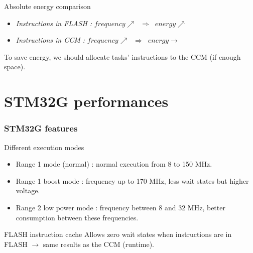 \documentclass[
	11pt, %
]{beamer}
\begin{document}
\begin{frame}{Absolute energy comparison}
\begin{figure}
	\end{figure}
	\begin{itemize}
		\item \emph{Instructions in FLASH :} $frequency \nearrow \; \; \Rightarrow \; \; energy \nearrow$
		\item \emph{Instructions in CCM : } $frequency \nearrow \; \; \Rightarrow \; \; energy \rightarrow$ 
	\end{itemize}
	To save energy, we should allocate tasks' instructions to the CCM (if enough space).
\end{frame}


\section{STM32G performances}
\begin{frame}
	\frametitle{STM32G features}
	\begin{block}{Different execution modes}
		\begin{itemize}
			\item Range 1 mode (normal) : normal execution from 8 to 150 MHz.
			\item Range 1 boost mode : frequency up to 170 MHz, less wait states but higher voltage.
			\item Range 2 low power mode : frequency between 8 and 32 MHz, better consumption between these frequencies.
		\end{itemize}
	\end{block}
	\begin{block}{FLASH instruction cache}
		Allows zero wait states when instructions are in FLASH $\rightarrow$ same results as the CCM (runtime).
	\end{block}
\end{frame}
\end{document}
